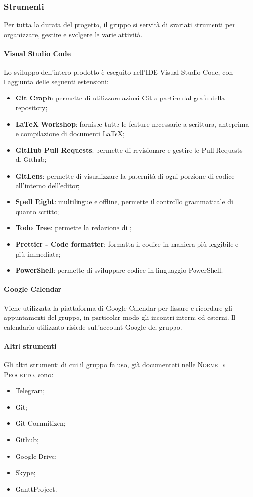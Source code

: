 \documentclass[../norme-di-progetto.tex]{subfiles}
\begin{document}
\subsubsection{Strumenti}
Per tutta la durata del progetto, il gruppo si servirà di svariati strumenti per organizzare, gestire e svolgere le varie attività.
\paragraph{Visual Studio Code}
Lo sviluppo dell'intero prodotto è eseguito nell'IDE Visual Studio Code, con l'aggiunta delle seguenti estensioni:
\begin{itemize}
  \item \textbf{Git Graph}: permette di utilizzare azioni Git a partire dal grafo della repository;
  \item \textbf{LaTeX Workshop}: fornisce tutte le feature necessarie a scrittura, anteprima e compilazione di documenti \LaTeX;
  \item \textbf{GitHub Pull Requests}: permette di revisionare e gestire le Pull Requests di Github;
  \item \textbf{GitLens}: permette di visualizzare la paternità di ogni porzione di codice all'interno dell'editor;
  \item \textbf{Spell Right}:  multilingue e offline, permette il controllo grammaticale di quanto scritto;
  \item \textbf{Todo Tree}: permette la redazione di ;
  \item \textbf{Prettier - Code formatter}: formatta il codice in maniera più leggibile e più immediata;
  \item \textbf{PowerShell}: permette di sviluppare codice in linguaggio PowerShell.
\end{itemize}

\paragraph{Google Calendar}
Viene utilizzata la piattaforma di Google Calendar per fissare e ricordare gli appuntamenti del gruppo, in particolar modo gli incontri interni ed esterni. Il calendario utilizzato risiede sull'account Google del gruppo.

\paragraph{Altri strumenti}
Gli altri strumenti di cui il gruppo fa uso, già documentati nelle \textsc{Norme di Progetto}, sono:
\begin{itemize}
  \item Telegram;
  \item Git;
  \item Git Commitizen;
  \item Github;
  \item Google Drive;
  \item Skype;
  \item GanttProject.
\end{itemize}
\end{document}
